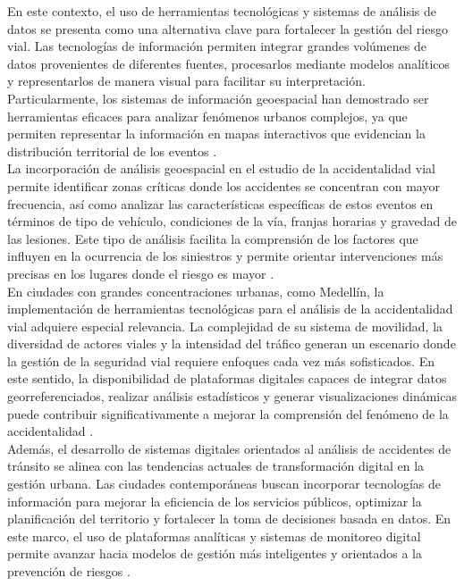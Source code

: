 En este contexto, el uso de herramientas tecnológicas y sistemas de análisis de datos se presenta como una alternativa clave para fortalecer la gestión del riesgo vial. Las tecnologías de información permiten integrar grandes volúmenes de datos provenientes de diferentes fuentes, procesarlos mediante modelos analíticos y representarlos de manera visual para facilitar su interpretación. Particularmente, los sistemas de información geoespacial han demostrado ser herramientas eficaces para analizar fenómenos urbanos complejos, ya que permiten representar la información en mapas interactivos que evidencian la distribución territorial de los eventos \cite{carrillo2024}.\\
La incorporación de análisis geoespacial en el estudio de la accidentalidad vial permite identificar zonas críticas donde los accidentes se concentran con mayor frecuencia, así como analizar las características específicas de estos eventos en términos de tipo de vehículo, condiciones de la vía, franjas horarias y gravedad de las lesiones. Este tipo de análisis facilita la comprensión de los factores que influyen en la ocurrencia de los siniestros y permite orientar intervenciones más precisas en los lugares donde el riesgo es mayor \cite{monar2025}.\\
En ciudades con grandes concentraciones urbanas, como Medellín, la implementación de herramientas tecnológicas para el análisis de la accidentalidad vial adquiere especial relevancia. La complejidad de su sistema de movilidad, la diversidad de actores viales y la intensidad del tráfico generan un escenario donde la gestión de la seguridad vial requiere enfoques cada vez más sofisticados. En este sentido, la disponibilidad de plataformas digitales capaces de integrar datos georreferenciados, realizar análisis estadísticos y generar visualizaciones dinámicas puede contribuir significativamente a mejorar la comprensión del fenómeno de la accidentalidad  \cite{parraga2024}.\\
Además, el desarrollo de sistemas digitales orientados al análisis de accidentes de tránsito se alinea con las tendencias actuales de transformación digital en la gestión urbana. Las ciudades contemporáneas buscan incorporar tecnologías de información para mejorar la eficiencia de los servicios públicos, optimizar la planificación del territorio y fortalecer la toma de decisiones basada en datos. En este marco, el uso de plataformas analíticas y sistemas de monitoreo digital permite avanzar hacia modelos de gestión más inteligentes y orientados a la prevención de riesgos \cite{changotasig2023}.\\
